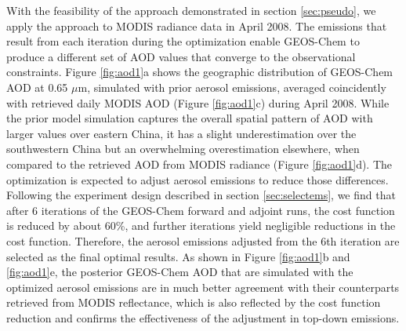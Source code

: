  With the feasibility of the approach demonstrated in section \ref{sec:pseudo}, 
 we apply the approach to MODIS radiance data in April 2008. 
 The emissions that result from each iteration during the optimization 
 enable GEOS-Chem to produce a different set of AOD values 
 that converge to the observational constraints. 
 Figure \ref{fig:aod1}a shows the geographic distribution of GEOS-Chem AOD at 0.65 $\mu$m, 
 simulated with prior aerosol emissions, averaged coincidently with retrieved daily MODIS AOD 
 (Figure \ref{fig:aod1}c) during April 2008. 
 While the prior model simulation captures the overall spatial pattern of AOD 
 with larger values over eastern China, 
 it has a slight underestimation over the southwestern China 
 but an overwhelming overestimation elsewhere, 
 when compared to the retrieved AOD from MODIS radiance (Figure \ref{fig:aod1}d). 
 The optimization is expected to adjust aerosol emissions to reduce those differences. 
 Following the experiment design described in section \ref{sec:selectems}, 
 we find that after 6 iterations of the GEOS-Chem forward and adjoint runs, 
 the cost function is reduced by about 60\%, 
 and further iterations yield negligible reductions in the cost function. 
 Therefore, the aerosol emissions adjusted from the 6th iteration are selected as the final optimal results. 
 As shown in Figure \ref{fig:aod1}b and \ref{fig:aod1}e, the posterior GEOS-Chem AOD 
 that are simulated with the optimized aerosol emissions 
 are in much better agreement with their counterparts retrieved from MODIS reflectance, 
 which is also reflected by the cost function reduction and 
 confirms the effectiveness of the adjustment in top-down emissions.

